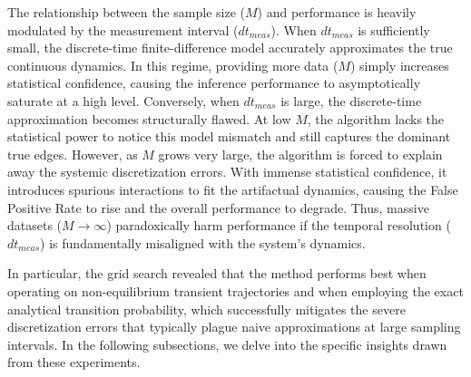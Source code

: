 \documentclass[10pt, aps, rmp,  twocolumn, superscriptaddress, floatfix, showkeys]{revtex4-2}
\begin{document}
The relationship between the sample size ($M$) and performance is heavily modulated by the measurement interval ($dt_{meas}$). When $dt_{meas}$ is sufficiently small, the discrete-time finite-difference model accurately approximates the true continuous dynamics. In this regime, providing more data ($M$) simply increases statistical confidence, causing the inference performance to asymptotically saturate at a high level. Conversely, when $dt_{meas}$ is large, the discrete-time approximation becomes structurally flawed. At low $M$, the algorithm lacks the statistical power to notice this model mismatch and still captures the dominant true edges. However, as $M$ grows very large, the algorithm is forced to explain away the systemic discretization errors. With immense statistical confidence, it introduces spurious interactions to fit the artifactual dynamics, causing the False Positive Rate to rise and the overall performance to degrade. Thus, massive datasets ($M \to \infty$) paradoxically harm performance if the temporal resolution ($dt_{meas}$) is fundamentally misaligned with the system's dynamics.

In particular, the grid search revealed that the method performs best when operating on non-equilibrium transient trajectories and when employing the exact analytical transition probability, which successfully mitigates the severe discretization errors that typically plague naive approximations at large sampling intervals. In the following subsections, we delve into the specific insights drawn from these experiments.
\end{document}
